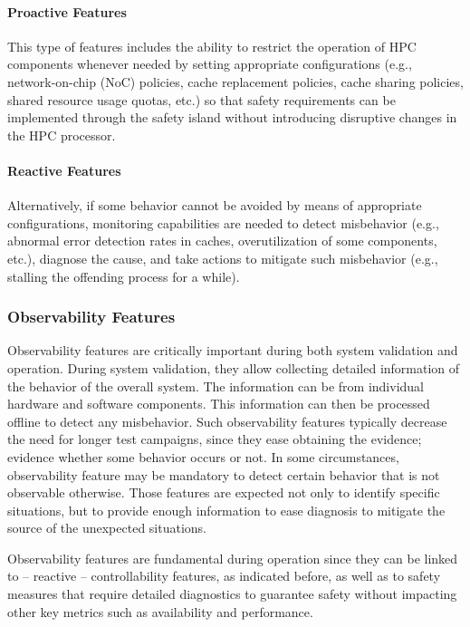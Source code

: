 \paragraph{Proactive Features}
This type of features includes the ability to restrict the operation of HPC components whenever needed by setting appropriate configurations (e.g., network-on-chip (NoC) policies, cache replacement policies, cache sharing policies, shared resource usage quotas, etc.) so that safety requirements can be implemented through the safety island without introducing disruptive changes in the HPC processor.

\paragraph{Reactive Features}
Alternatively, if some behavior cannot be avoided by means of appropriate configurations, monitoring capabilities are needed to detect misbehavior (e.g., abnormal error detection rates in caches, overutilization of some components, etc.), diagnose the cause, and take actions to mitigate such misbehavior (e.g., stalling the offending process for a while).


\subsubsection{Observability Features}
Observability features are critically important during both system validation and operation. During system validation, they allow collecting detailed information of the behavior of the overall system. The information can be from individual hardware and software components. This information can then be processed offline to detect any misbehavior. Such observability features typically decrease the need for longer test campaigns, since they ease obtaining the evidence; evidence whether some behavior occurs or not. In some circumstances, observability feature may be mandatory to detect certain behavior that is not observable otherwise.
Those features are expected not only to identify specific situations, but to provide enough information to ease diagnosis to mitigate the source of the unexpected situations.

Observability features are fundamental during operation since they can be linked to -- reactive -- controllability features, as indicated before, as well as to safety measures that require detailed diagnostics to guarantee safety without impacting other key metrics such as availability and performance.

